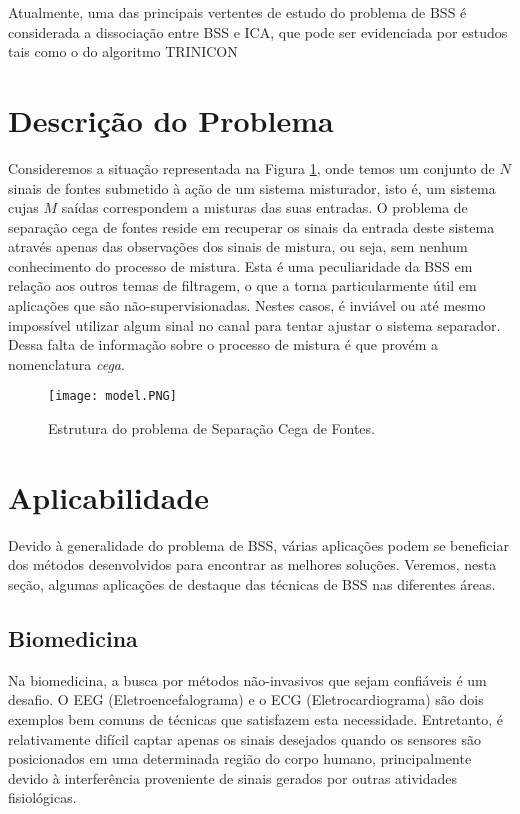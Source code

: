     
    Atualmente, uma das principais vertentes de estudo do problema de BSS é considerada a dissociação entre BSS e ICA, que pode ser evidenciada por estudos tais como o do algoritmo TRINICON \cite{trinicon}
    
\section{Descrição do Problema}
    
    Consideremos a situação representada na Figura \ref{fig:structure}, onde temos um conjunto de $N$ sinais de fontes submetido à ação de um sistema misturador, isto é, um sistema cujas $M$ saídas correspondem a misturas das suas entradas. O problema de separação cega de fontes reside em recuperar os sinais da entrada deste sistema através apenas das observações dos sinais de mistura, ou seja, sem nenhum conhecimento do processo de mistura. Esta é uma peculiaridade da BSS em relação aos outros temas de filtragem, o que a torna particularmente útil em aplicações que são não-supervisionadas. Nestes casos, é inviável ou até mesmo impossível utilizar algum sinal no canal para tentar ajustar o sistema separador. Dessa falta de informação sobre o processo de mistura é que provém a nomenclatura \textit{cega}.
    
    \begin{figure}
       \hfill\texttt{[image: model.PNG]}\hspace*{\fill}
        \caption{Estrutura do problema de Separação Cega de Fontes.}
        \label{fig:structure}
    \end{figure}


\section{Aplicabilidade}
    Devido à generalidade do problema de BSS, várias aplicações podem se beneficiar dos métodos desenvolvidos para encontrar as melhores soluções. Veremos, nesta seção, algumas aplicações de destaque das técnicas de BSS nas diferentes áreas.
    
\subsection{Biomedicina}
    Na biomedicina, a busca por métodos não-invasivos que sejam confiáveis é um desafio. O EEG (Eletroencefalograma) e o ECG (Eletrocardiograma) são dois exemplos bem comuns de técnicas que satisfazem esta necessidade. Entretanto, é relativamente difícil captar apenas os sinais desejados quando os sensores são posicionados em uma determinada região do corpo humano, principalmente devido à interferência proveniente de sinais gerados por outras atividades fisiológicas.
       
